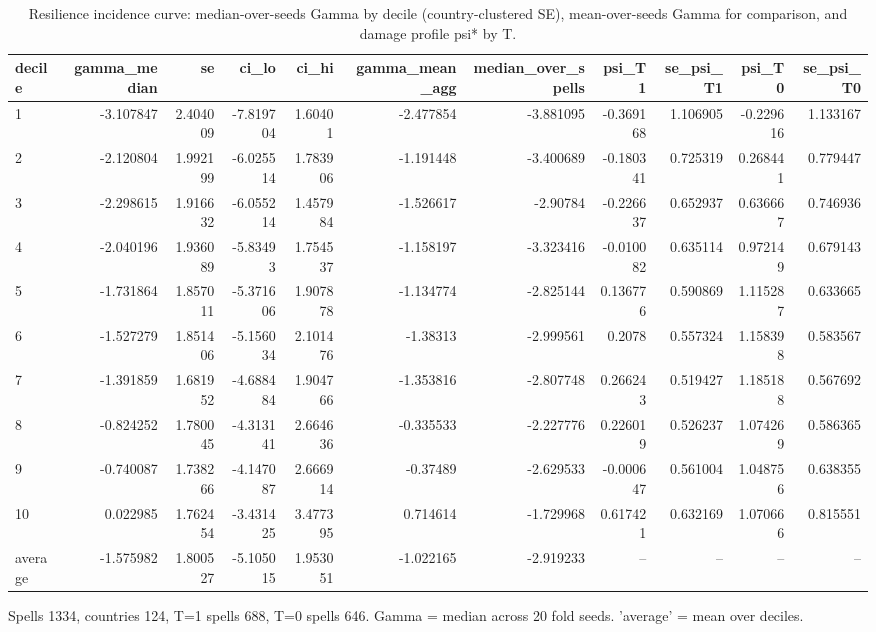 \begin{table}[htbp]
\centering
\caption{Resilience incidence curve: median-over-seeds Gamma by decile (country-clustered SE), mean-over-seeds Gamma for comparison, and damage profile psi* by T.}
\label{tab:incidence}
\begin{tabular}{lrrrrrrrrrr}
\toprule
decile & gamma\_median & se & ci\_lo & ci\_hi & gamma\_mean\_agg & median\_over\_spells & psi\_T1 & se\_psi\_T1 & psi\_T0 & se\_psi\_T0 \\
\midrule
1 & -3.107847 & 2.404009 & -7.819704 & 1.60401 & -2.477854 & -3.881095 & -0.369168 & 1.106905 & -0.229616 & 1.133167 \\
2 & -2.120804 & 1.992199 & -6.025514 & 1.783906 & -1.191448 & -3.400689 & -0.180341 & 0.725319 & 0.268441 & 0.779447 \\
3 & -2.298615 & 1.916632 & -6.055214 & 1.457984 & -1.526617 & -2.90784 & -0.226637 & 0.652937 & 0.636667 & 0.746936 \\
4 & -2.040196 & 1.936089 & -5.83493 & 1.754537 & -1.158197 & -3.323416 & -0.010082 & 0.635114 & 0.972149 & 0.679143 \\
5 & -1.731864 & 1.857011 & -5.371606 & 1.907878 & -1.134774 & -2.825144 & 0.136776 & 0.590869 & 1.115287 & 0.633665 \\
6 & -1.527279 & 1.851406 & -5.156034 & 2.101476 & -1.38313 & -2.999561 & 0.2078 & 0.557324 & 1.158398 & 0.583567 \\
7 & -1.391859 & 1.681952 & -4.688484 & 1.904766 & -1.353816 & -2.807748 & 0.266243 & 0.519427 & 1.185188 & 0.567692 \\
8 & -0.824252 & 1.780045 & -4.313141 & 2.664636 & -0.335533 & -2.227776 & 0.226019 & 0.526237 & 1.074269 & 0.586365 \\
9 & -0.740087 & 1.738266 & -4.147087 & 2.666914 & -0.37489 & -2.629533 & -0.000647 & 0.561004 & 1.048756 & 0.638355 \\
10 & 0.022985 & 1.762454 & -3.431425 & 3.477395 & 0.714614 & -1.729968 & 0.617421 & 0.632169 & 1.070666 & 0.815551 \\
average & -1.575982 & 1.800527 & -5.105015 & 1.953051 & -1.022165 & -2.919233 & -- & -- & -- & -- \\
\bottomrule
\end{tabular}
\par\smallskip\footnotesize Spells 1334, countries 124, T=1 spells 688, T=0 spells 646. Gamma = median across 20 fold seeds. 'average' = mean over deciles.
\end{table}
